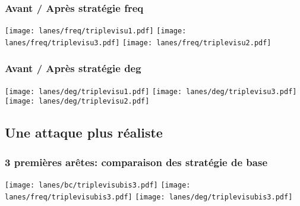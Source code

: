 \documentclass[aspectratio=169]{beamer}
\begin{document}
    \begin{frame}
        \frametitle{Avant / Après stratégie freq}
        \texttt{[image: lanes/freq/triplevisu1.pdf]}
        \texttt{[image: lanes/freq/triplevisu3.pdf]}
        \texttt{[image: lanes/freq/triplevisu2.pdf]}
    \end{frame}

    \begin{frame}
        \frametitle{Avant / Après stratégie deg}
        \texttt{[image: lanes/deg/triplevisu1.pdf]}
        \texttt{[image: lanes/deg/triplevisu3.pdf]}
        \texttt{[image: lanes/deg/triplevisu2.pdf]}
    \end{frame}

    \subsection{Une attaque plus réaliste}
    \begin{frame}
        \frametitle{3 premières arêtes: comparaison des stratégie de base}
        \texttt{[image: lanes/bc/triplevisubis3.pdf]}
        \texttt{[image: lanes/freq/triplevisubis3.pdf]}
        \texttt{[image: lanes/deg/triplevisubis3.pdf]}
    \end{frame}
    
\end{document}
